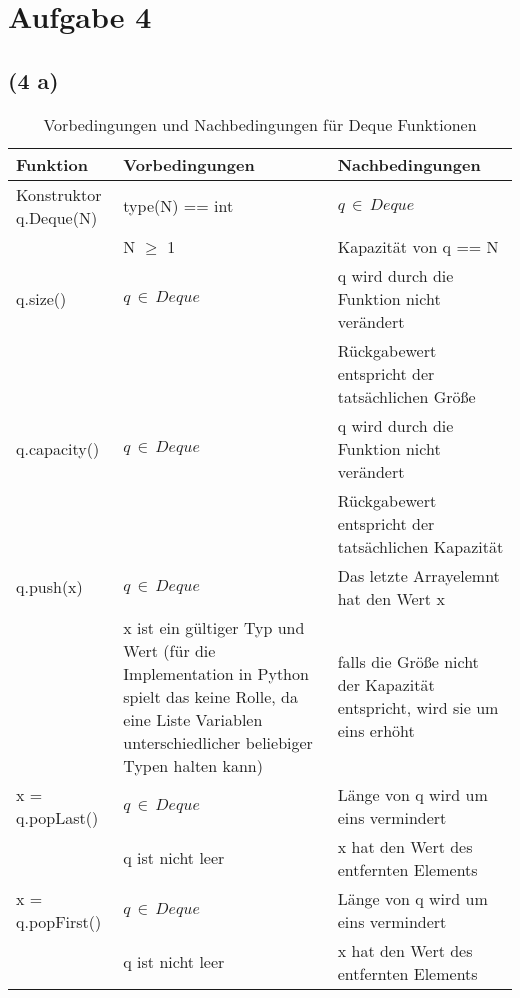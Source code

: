 \documentclass[a4paper]{article}
\begin{document}
\section*{Aufgabe 4}
\subsection*{(4 a)}

\begin{table}[h]
\caption{Vorbedingungen und Nachbedingungen für Deque Funktionen}
\label{bookmarksavepage}\centering
\begin{tabularx}{\textwidth}{X|X|X}
\toprule
Funktion & Vorbedingungen & Nachbedingungen \\\midrule
Konstruktor q.Deque(N) & type(N) == int & $q\,\in\,Deque$ \\
& N $\geq$ 1 & Kapazität von q == N \\\midrule
q.size() & $q\,\in\,Deque$ & q wird durch die Funktion nicht verändert \\
& & Rückgabewert entspricht der tatsächlichen Größe \\\midrule
q.capacity() & $q\,\in\,Deque$ & q wird durch die Funktion nicht verändert \\
& & Rückgabewert entspricht der tatsächlichen Kapazität \\\midrule
q.push(x) & $q\,\in\,Deque$ & Das letzte Arrayelemnt hat den Wert x \\
& x ist ein gültiger Typ und Wert (für die Implementation in Python spielt das keine Rolle, da eine Liste Variablen unterschiedlicher beliebiger Typen halten kann) & falls die Größe nicht der Kapazität entspricht, wird sie um eins erhöht \\\midrule
x = q.popLast() & $q\,\in\,Deque$ & Länge von q wird um eins vermindert \\
& q ist nicht leer & x hat den Wert des entfernten Elements \\\midrule
x = q.popFirst() & $q\,\in\,Deque$ & Länge von q wird um eins vermindert \\
& q ist nicht leer & x hat den Wert des entfernten Elements \\\bottomrule



\end{tabularx}
\end{table}
\end{document}
